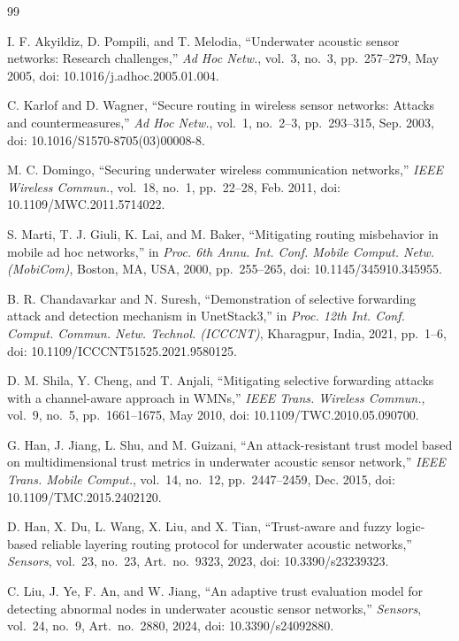\documentclass[11pt]{article}
\begin{document}
\begin{thebibliography}{99}
\small

I. F. Akyildiz, D. Pompili, and T. Melodia, ``Underwater acoustic sensor networks: Research challenges,'' \emph{Ad Hoc Netw.}, vol.~3, no.~3, pp.~257--279, May 2005, doi: 10.1016/j.adhoc.2005.01.004.

C. Karlof and D. Wagner, ``Secure routing in wireless sensor networks: Attacks and countermeasures,'' \emph{Ad Hoc Netw.}, vol.~1, no.~2--3, pp.~293--315, Sep. 2003, doi: 10.1016/S1570-8705(03)00008-8.

M. C. Domingo, ``Securing underwater wireless communication networks,'' \emph{IEEE Wireless Commun.}, vol.~18, no.~1, pp.~22--28, Feb. 2011, doi: 10.1109/MWC.2011.5714022.

S. Marti, T. J. Giuli, K. Lai, and M. Baker, ``Mitigating routing misbehavior in mobile ad hoc networks,'' in \emph{Proc. 6th Annu. Int. Conf. Mobile Comput. Netw. (MobiCom)}, Boston, MA, USA, 2000, pp.~255--265, doi: 10.1145/345910.345955.

B. R. Chandavarkar and N. Suresh, ``Demonstration of selective forwarding attack and detection mechanism in UnetStack3,'' in \emph{Proc. 12th Int. Conf. Comput. Commun. Netw. Technol. (ICCCNT)}, Kharagpur, India, 2021, pp.~1--6, doi: 10.1109/ICCCNT51525.2021.9580125.

D. M. Shila, Y. Cheng, and T. Anjali, ``Mitigating selective forwarding attacks with a channel-aware approach in WMNs,'' \emph{IEEE Trans. Wireless Commun.}, vol.~9, no.~5, pp.~1661--1675, May 2010, doi: 10.1109/TWC.2010.05.090700.

G. Han, J. Jiang, L. Shu, and M. Guizani, ``An attack-resistant trust model based on multidimensional trust metrics in underwater acoustic sensor network,'' \emph{IEEE Trans. Mobile Comput.}, vol.~14, no.~12, pp.~2447--2459, Dec. 2015, doi: 10.1109/TMC.2015.2402120.

D. Han, X. Du, L. Wang, X. Liu, and X. Tian, ``Trust-aware and fuzzy logic-based reliable layering routing protocol for underwater acoustic networks,'' \emph{Sensors}, vol.~23, no.~23, Art.~no.~9323, 2023, doi: 10.3390/s23239323.

C. Liu, J. Ye, F. An, and W. Jiang, ``An adaptive trust evaluation model for detecting abnormal nodes in underwater acoustic sensor networks,'' \emph{Sensors}, vol.~24, no.~9, Art.~no.~2880, 2024, doi: 10.3390/s24092880.


\end{thebibliography}
\end{document}
